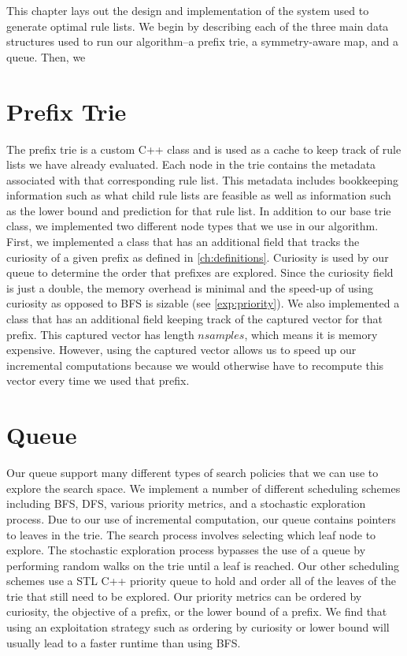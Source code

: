 \documentclass[]{report}
\theoremstyle{definition}
\begin{document}
This chapter lays out the design and implementation of the system used to generate optimal rule lists. 
We begin by describing each of the three main data structures used to run our algorithm--a prefix trie, a symmetry-aware map, and a queue. 
Then, we 

\section{Prefix Trie}
The prefix trie is a custom C++ class and is used as a cache to keep track of rule lists we have already evaluated. 
Each node in the trie contains the metadata associated with that corresponding rule list. 
This metadata includes bookkeeping information such as what child rule lists are feasible as well as information such as the lower bound and prediction for that rule list.
In addition to our base trie class, we implemented two different node types that we use in our algorithm.
First, we implemented a class that has an additional field that tracks the curiosity of a given prefix as defined in \ref{ch:definitions}.
Curiosity is used by our queue to determine the order that prefixes are explored.
Since the curiosity field is just a double, the memory overhead is minimal and the speed-up of using curiosity as opposed to BFS is sizable (see \ref{exp:priority}).
We also implemented a class that has an additional field keeping track of the captured vector for that prefix.
This captured vector has length $nsamples$, which means it is memory expensive.
However, using the captured vector allows us to speed up our incremental computations because we would otherwise have to recompute this vector every time we used that prefix.

\section{Queue}\label{sec:queue}
Our queue support many different types of search policies that we can use to explore the search space.
We implement a number of different scheduling schemes including BFS, DFS, various priority metrics, and a stochastic exploration process.
Due to our use of incremental computation, our queue contains pointers to leaves in the trie.
The search process involves selecting which leaf node to explore.
The stochastic exploration process bypasses the use of a queue by performing random walks on the trie until a leaf is reached.
Our other scheduling schemes use a STL C++ priority queue to hold and order all of the leaves of the trie that still need to be explored.
Our priority metrics can be ordered by curiosity, the objective of a prefix, or the lower bound of a prefix.
We find that using an exploitation strategy such as ordering by curiosity or lower bound will usually lead to a faster runtime than using BFS.
\end{document}
